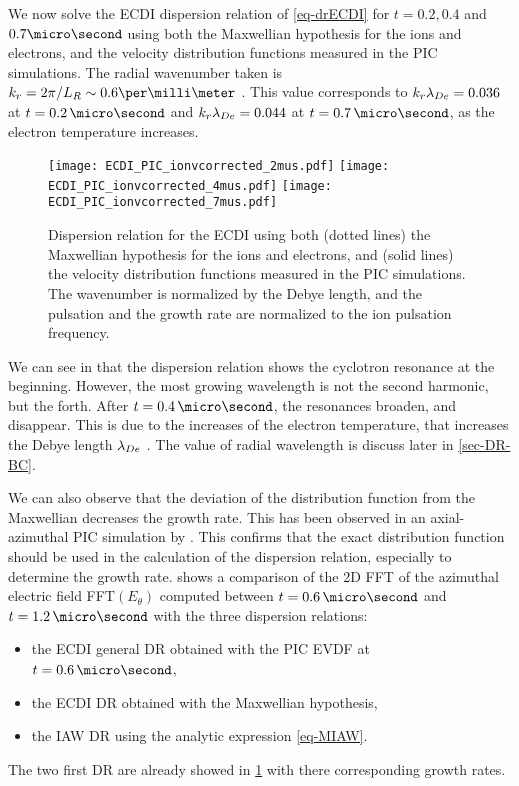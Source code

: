     \vspace{1em}
    We now solve the \ac{ECDI} dispersion relation of \cref{eq-drECDI} for $t=0.2, 0.4$ and $0.7\micro\second$ using both the Maxwellian hypothesis for the ions and electrons, and the velocity distribution functions measured in the \ac{PIC} simulations.
    The radial wavenumber taken is $k_r = 2 \pi/L_R \sim 0.6 \per\milli\meter$ \citep{lafleur2016,janhunen2018}.
    This value corresponds to $k_r \lambda_{De} = 0.036$ at $t=0.2\,\micro\second$ and $k_r \lambda_{De} = 0.044$ at $t=0.7\,\micro\second$, as the electron temperature increases.
    \begin{figure}[!hbt]
      \centering
        \texttt{[image: ECDI\_PIC\_ionvcorrected\_2mus.pdf]} 
        \texttt{[image: ECDI\_PIC\_ionvcorrected\_4mus.pdf]} 
        \texttt{[image: ECDI\_PIC\_ionvcorrected\_7mus.pdf]} 
      \caption{Dispersion relation for the \acs{ECDI} using both (dotted lines) the Maxwellian hypothesis for the ions and electrons, and (solid lines) the velocity distribution functions measured in the \acs{PIC} simulations. The wavenumber is normalized by the Debye length, and the pulsation and the growth rate are normalized to the ion pulsation frequency.}
      \label{fig-DRECDI}
    \end{figure}
    
    We can see in  that the dispersion relation shows the cyclotron resonance at the beginning.
    However, the most growing wavelength is not the second harmonic, but the forth.
    After $t=0.4\,\micro\second$, the resonances broaden, and disappear.
    This is due to the increases of the electron temperature, that increases the Debye length $\lambda_{De}$ \citep{lafleur2016a,ducrocq2006,cavalier2013}.
    The value of radial wavelength is discuss later in \cref{sec-DR-BC}.
    
    We can also observe that the deviation of the distribution function from the Maxwellian decreases the growth rate.
    This has been observed  in an axial-azimuthal \ac{PIC} simulation by \citet{lafleur2018}.
    This confirms that the exact distribution function should be used in the calculation of the dispersion relation, especially to determine the growth rate.
     shows a comparison of the \ac{2D} \ac{FFT} of the azimuthal electric field FFT$(E_{\theta})$ computed between  $t=0.6\,\micro\second$ and $t=1.2\,\micro\second$  with the three dispersion relations\string:
    \begin{itemize}
      \item the \ac{ECDI} general \ac{DR} obtained with the \ac{PIC} \ac{EVDF} at $t=0.6\,\micro\second$,
      \item the \ac{ECDI} \ac{DR} obtained with the Maxwellian hypothesis,
      \item the \ac{IAW} \ac{DR} using the analytic expression \cref{eq-MIAW}. 
    \end{itemize}
    The two first \ac{DR} are already showed in \cref{fig-DRECDI} with there corresponding growth rates.


